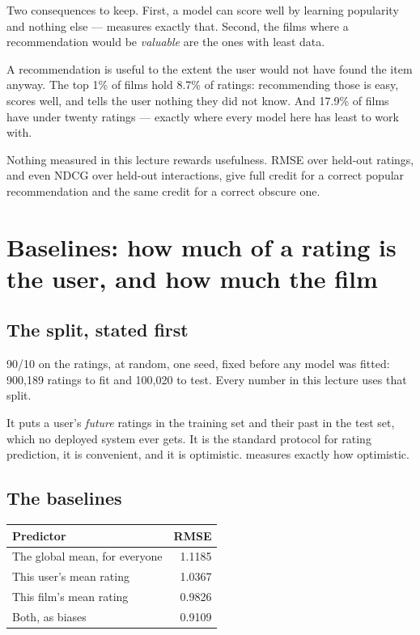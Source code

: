 \documentclass[11pt,a4paper]{article}
\begin{document}
Two consequences to keep. First, a model can score well by learning popularity
and nothing else ---  measures exactly that. Second, the films
where a recommendation would be \emph{valuable} are the ones with least data.

\begin{keybox}[title={The tail is where the value is}]
A recommendation is useful to the extent the user would not have found the item
anyway. The top 1\% of films hold 8.7\% of ratings: recommending those is easy,
scores well, and tells the user nothing they did not know. And 17.9\% of films
have under twenty ratings --- exactly where every model here has least to work
with.

Nothing measured in this lecture rewards usefulness. RMSE over held-out
ratings, and even NDCG over held-out interactions, give full credit for a
correct popular recommendation and the same credit for a correct obscure one.
\end{keybox}

\section{Baselines: how much of a rating is the user, and how much the film}

\subsection{The split, stated first}

90/10 on the ratings, at random, one seed, fixed before any model was fitted:
900{,}189 ratings to fit and 100{,}020 to test. Every number in this lecture
uses that split.

\begin{failbox}[title={Failure condition --- a random split of ratings is not innocent}]
It puts a user's \emph{future} ratings in the training set and their past in
the test set, which no deployed system ever gets. It is the standard protocol
for rating prediction, it is convenient, and it is optimistic. 
measures exactly how optimistic.
\end{failbox}

\subsection{The baselines}

\begin{center}
\small
\begin{tabular}{lr}
\toprule
\textbf{Predictor} & \textbf{RMSE} \\
\midrule
The global mean, for everyone & 1.1185 \\
This user's mean rating       & 1.0367 \\
This film's mean rating       & 0.9826 \\
Both, as biases               & 0.9109 \\
\bottomrule
\end{tabular}
\end{center}
\end{document}
